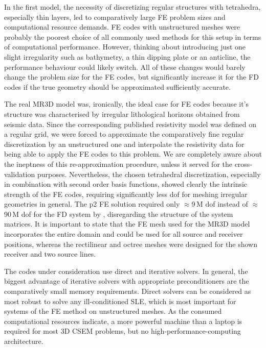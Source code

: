 \documentclass[
    paper,
  ]{geophysics}
\begin{document}
In the first model, the necessity of discretizing regular structures with tetrahedra, especially thin layers, led to comparatively large FE problem sizes and computational resource demands. FE codes with unstructured meshes were probably the poorest choice of all commonly used methods for this setup in terms of computational performance. However, thinking about introducing just one slight irregularity such as bathymetry, a thin dipping plate or an anticline, the performance behaviour could likely switch. All of these changes would barely change the problem size for the FE codes, but significantly increase it for the FD codes if the true geometry should be approximated sufficiently accurate.

The real MR3D model was, ironically, the ideal case for FE codes because it's structure was characterised by irregular lithological horizons obtained from seismic data. Since the corresponding published resistivity model was defined on a regular grid, we were forced to approximate the comparatively fine regular discretization by an unstructured one and interpolate the resistivity data for being able to apply the FE codes to this problem. We are completely aware about the ineptness of this re-approximation procedure, unless it served for the cross-validation purposes. Nevertheless, the chosen tetrahedral discretization, especially in combination with second order basis functions, showed clearly the intrinsic strength of the FE codes, requiring significantly less dof for meshing irregular geometries in general. The p2 FE solution required only $\approx$9\,M dof  instead of $\approx$90\,M dof for the FD system by \citet{GEO.19.Correa}, disregarding the structure of the system matrices. It is important to state that the FE mesh used for the MR3D model incorporates the entire domain and could be used for all source and receiver positions, whereas the rectilinear and octree meshes were designed for the shown receiver and two source lines.

The codes under consideration use direct and iterative solvers. In general, the biggest advantage of iterative solvers with appropriate preconditioners are the comparatively small memory requirements. Direct solvers can be considered as most robust to solve any ill-conditioned SLE, which is most important for systems of the FE method on unstructured meshes. As the consumed computational resources indicate, a more powerful machine than a laptop is required for most 3D CSEM problems, but no high-performance-computing architecture.
\end{document}
